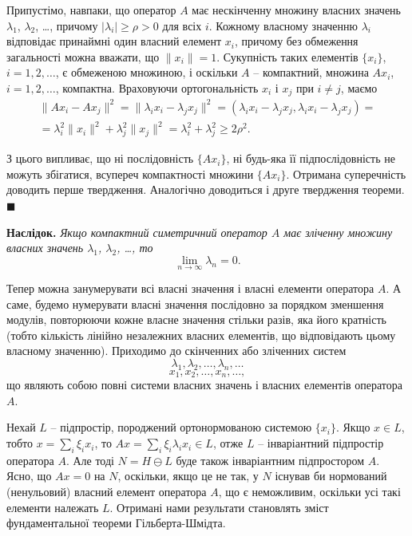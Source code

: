 \documentclass[14pt,twoside]{extreport}
\theoremstyle{mystyle}
\renewenvironment{proof}{{\bfseries Доведення.}}{$\blacksquare$}
\numberwithin{equation}{chapter}
\begin{document}
\begin{proof}
Припустімо, навпаки, що оператор $A$ має нескінченну множину власних значень $\lambda_1$, $\lambda_2$, \ldots, причому $|\lambda_i|\geqslant \rho > 0$ для всіх $i$. Кожному власному значенню $\lambda_i$ відповідає принаймні один власний елемент $x_i$, причому без обмеження загальності можна вважати, що $\|x_i\| = 1$. Сукупність таких елементів $\{x_i\}$, $i=1, 2, \ldots$, є обмеженою множиною, і оскільки $A$ -- компактний, множина $Ax_i$, $i = 1, 2, \ldots$, компактна. Враховуючи ортогональність $x_i$ і $x_j$ при $i \neq j$, маємо
\begin{multline*}
 \|Ax_i - Ax_j\|^2 = \|\lambda_i x_i - \lambda_j x_j\|^2 = (\lambda_i x_i - \lambda_j x_j, \lambda_i x_i - \lambda_j x_j)=\\
= \lambda_i^2 \|x_i\|^2 + \lambda_j^2\|x_j\|^2 = \lambda_i^2 + \lambda_j^2 \geqslant 2\rho^2.
\end{multline*}

З цього випливає, що ні послідовність $\{Ax_i\}$, ні будь-яка її підпослідовність не можуть збігатися, всупереч компактності множини $\{Ax_i\}$. Отримана суперечність доводить перше твердження. Аналогічно доводиться і друге твердження теореми.
\end{proof}

\textbf{Наслідок.} \emph{Якщо компактний симетричний оператор $A$ має зліченну множину власних значень $\lambda_1$, $\lambda_2$, \ldots, то}
\[
 \lim_{n\to\infty} \lambda_n = 0.
\]

Тепер можна занумерувати всі власні значення і власні елементи оператора $A$. А саме, будемо нумерувати власні значення послідовно за порядком зменшення модулів, повторюючи кожне власне значення стільки разів, яка його кратність (тобто кількість лінійно незалежних власних елементів, що відповідають цьому власному значенню). Приходимо до скінченних або зліченних систем
\[
 \lambda_1, \lambda_2, \ldots, \lambda_n, \ldots
\]
\[
x_1, x_2, \ldots, x_n, \ldots,
\]
що являють собою повні системи власних значень і власних елементів оператора $A$.

Нехай $L$ -- підпростір, породжений ортонормованою системою $\{x_i\}$. Якщо $x \in L$, тобто $x= \sum\limits_{i} \xi_i x_i$, то $Ax = \sum\limits_{i} \xi_i \lambda_i x_i \in L$, отже $L$ -- інваріантний підпростір оператора $A$. Але тоді $N = H \ominus L$ буде також інваріантним підпростором $A$. Ясно, що $Ax = 0$ на $N$, оскільки, якщо це не так, у $N$ існував би нормований (ненульовий) власний елемент оператора $A$, що є неможливим, оскільки усі такі елементи належать $L$. Отримані нами результати становлять зміст фундаментальної теореми Гільберта-Шмідта.
\end{document}
